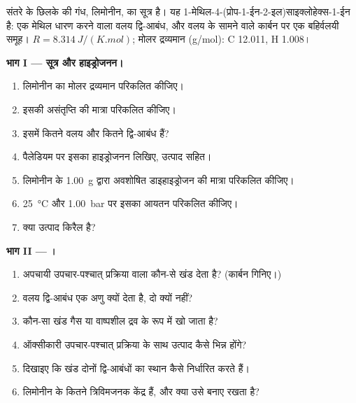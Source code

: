 \begin{problem}
\label{pb:b2:alkene-redox:1}
संतरे के छिलके की गंध, लिमोनीन, का सूत्र  है। यह
1-मेथिल-4-(प्रोप-1-ईन-2-इल)साइक्लोहेक्स-1-ईन है: एक मेथिल धारण करने वाला वलय द्वि-आबंध, और वलय के
सामने वाले कार्बन पर एक बहिर्वलयी  समूह। $R =
\qty{8.314}{J/(K.mol)}$; मोलर द्रव्यमान (\unit{g/mol}): C 12.011, H 1.008।

\medskip
\noindent\textbf{भाग I --- सूत्र और हाइड्रोजनन।}
\begin{enumerate}
  \item लिमोनीन का मोलर द्रव्यमान परिकलित कीजिए।
  \item इसकी असंतृप्ति की मात्रा परिकलित कीजिए।
  \item इसमें कितने वलय और कितने द्वि-आबंध हैं?
  \item पैलेडियम पर इसका हाइड्रोजनन लिखिए, उत्पाद सहित।
  \item लिमोनीन के \qty{1.00}{g} द्वारा अवशोषित डाइहाइड्रोजन की मात्रा परिकलित कीजिए।
  \item \qty{25}{\degreeCelsius} और \qty{1.00}{bar} पर इसका आयतन परिकलित कीजिए।
  \item क्या उत्पाद किरैल है?
\end{enumerate}

\medskip
\noindent\textbf{भाग II --- ।}
\begin{enumerate}[resume]
  \item अपचायी उपचार-पश्चात् प्रक्रिया वाला  कौन-से खंड देता है? (कार्बन गिनिए।)
  \item वलय द्वि-आबंध एक अणु क्यों देता है, दो क्यों नहीं?
  \item कौन-सा खंड गैस या वाष्पशील द्रव के रूप में खो जाता है?
  \item ऑक्सीकारी उपचार-पश्चात् प्रक्रिया के साथ उत्पाद कैसे भिन्न होंगे?
  \item दिखाइए कि खंड दोनों द्वि-आबंधों का स्थान कैसे निर्धारित करते हैं।
  \item लिमोनीन के कितने त्रिविमजनक केंद्र हैं, और क्या  उसे बनाए रखता है?
\end{enumerate}


\end{problem}
